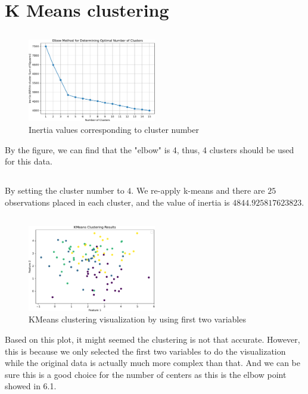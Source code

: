 \documentclass{article}
\begin{document}
\section{K Means clustering}
\subsection{}
\begin{figure}[h]
    \begin{center}
        \includegraphics[width=0.5\textwidth]{./assist/elbow_method.pdf}
        \caption{Inertia values corresponding to cluster number}
    \end{center}
\end{figure}
By the figure, we can find that the "elbow" is 4, thus, 4 clusters should be used for this data.
\subsection{}
By setting the cluster number to $4$. We re-apply k-means and there are $25$ observations placed in each cluster, and the value of inertia is $4844.925817623823$.
\subsection{}
\begin{figure}[htbp]
    \begin{center}
        \includegraphics[width=0.5\textwidth]{./assist/kmeans_clustering_results.pdf}
        \caption{KMeans clustering visualization by using first two variables}
    \end{center}
\end{figure}
Based on this plot, it might seemed the clustering is not that accurate. However, this is because we only selected the first two variables to do the visualization while the original data is actually much more complex than that. And we can be sure this is a good choice for the number of centers as this is the elbow point showed in 6.1.
\end{document}

